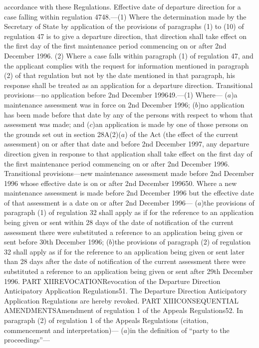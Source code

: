 \documentclass[a4paper]{article}
\begin{document}
accordance with these Regulations.
Effective date of departure direction for a case falling within regulation
4748.—(1) Where the determination made by the Secretary of State by application
of the provisions of paragraphs (1) to (10) of regulation 47 is to give a
departure direction, that direction shall take effect on the first day of the
first maintenance period commencing on or after 2nd December 1996.
(2) Where a case falls within paragraph (1) of regulation 47, and the applicant
complies with the request for information mentioned in paragraph (2) of that
regulation but not by the date mentioned in that paragraph, his response shall
be treated as an application for a departure direction.
Transitional provisions—no application before 2nd December 199649.—(1) Where—
($a$)a maintenance assessment was in force on 2nd December 1996;
($b$)no application has been made before that date by any of the persons with
respect to whom that assessment was made; and
($c$)an application is made by one of those persons on the grounds set out in
section 28A(2)($a$) of the Act (the effect of the current assessment) on or after
that date and before 2nd December 1997,
any departure direction given in response to that application shall take effect
on the first day of the first maintenance period commencing on or after 2nd
December 1996.
Transitional provisions—new maintenance assessment made before 2nd December 1996
whose effective date is on or after 2nd December 199650. Where a new maintenance
assessment is made before 2nd December 1996 but the effective date of that
assessment is a date on or after 2nd December 1996—
($a$)the provisions of paragraph (1) of regulation 32 shall apply as if for the
reference to an application being given or sent within 28 days of the date of
notification of the current assessment there were substituted a reference to an
application being given or sent before 30th December 1996;
($b$)the provisions of paragraph (2) of regulation 32 shall apply as if for the
reference to an application being given or sent later than 28 days after the
date of notification of the current assessment there were substituted a
reference to an application being given or sent after 29th December 1996.
PART XIIREVOCATIONRevocation of the Departure Direction Anticipatory Application
Regulations51. The Departure Direction Anticipatory Application Regulations are
hereby revoked.
PART XIIICONSEQUENTIAL AMENDMENTSAmendment of regulation 1 of the Appeals
Regulations52. In paragraph (2) of regulation 1 of the Appeals Regulations
(citation, commencement and interpretation)—
($a$)in the definition of “party to the proceedings”—
\end{document}

